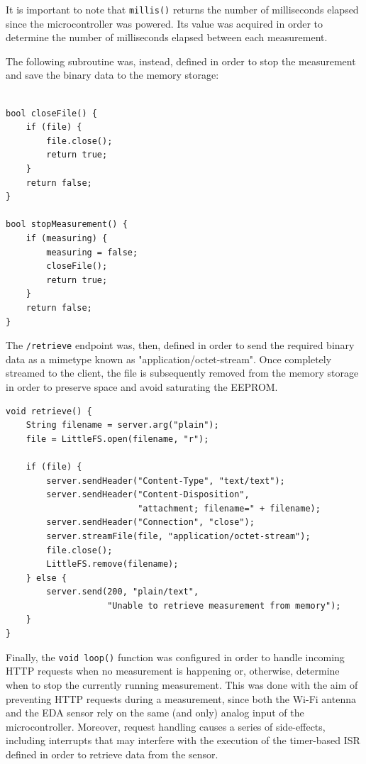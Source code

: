 It is important to note that \texttt{millis()} returns the number of milliseconds elapsed since the microcontroller was powered. Its value was acquired in order to determine the number of milliseconds elapsed between each measurement.

The following subroutine was, instead, defined in order to stop the measurement and save the binary data to the memory storage:

\begin{verbatim}

bool closeFile() {
    if (file) {
        file.close();
        return true;
    }
    return false;
}

bool stopMeasurement() {
    if (measuring) {
        measuring = false;
        closeFile();
        return true;
    }
    return false;
}
\end{verbatim}

The \texttt{/retrieve} endpoint was, then, defined in order to send the required binary data as a mimetype known as "application/octet-stream". Once completely streamed to the client, the file is subsequently removed from the memory storage in order to preserve space and avoid saturating the EEPROM.

\begin{verbatim}
void retrieve() {
    String filename = server.arg("plain");
    file = LittleFS.open(filename, "r");

    if (file) {
        server.sendHeader("Content-Type", "text/text");
        server.sendHeader("Content-Disposition", 
                          "attachment; filename=" + filename);
        server.sendHeader("Connection", "close");
        server.streamFile(file, "application/octet-stream");
        file.close();
        LittleFS.remove(filename);
    } else {
        server.send(200, "plain/text", 
                    "Unable to retrieve measurement from memory");
    }
}
\end{verbatim}

Finally, the \texttt{void loop()} function was configured in order to handle incoming HTTP requests when no measurement is happening or, otherwise, determine when to stop the currently running measurement. This was done with the aim of preventing HTTP requests during a measurement, since both the Wi-Fi antenna and the EDA sensor rely on the same (and only) analog input of the microcontroller. Moreover, request handling causes a series of side-effects, including interrupts that may interfere with the execution of the timer-based ISR defined in order to retrieve data from the sensor.

